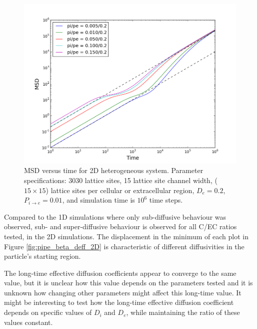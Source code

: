 	\begin{figure}[h]
		\centering
		\includegraphics[width=1.0\linewidth]{../images/2D/pipe_msd_2D}
		\caption{MSD versus time for 2D heterogeneous system. Parameter specifications: 3030 lattice sites, 15 lattice site channel width, ($ 15 \times 15 $) lattice sites per cellular or extracellular region, $ D_e = 0.2 $, $ P_{i \rightarrow e} = 0.01 $, and simulation time is $ 10^6 $ time steps.}
		\label{fig:pipe_msd_2D}
	\end{figure}
	
	Compared to the 1D simulations where only sub-diffusive behaviour was observed, sub- and super-diffusive behaviour is observed for all C/EC ratios tested, in the 2D simulations. The displacement in the minimum of each plot in Figure \ref{fig:pipe_beta_deff_2D} is characteristic of different diffusivities in the particle's starting region.
	
	The long-time effective diffusion coefficients appear to converge to the same value, but it is unclear how this value depends on the parameters tested and it is unknown how changing other parameters might affect this long-time value. It might be interesting to test how the long-time effective diffusion coefficient depends on specific values of $ D_i $ and $ D_e $, while maintaining the ratio of these values constant.
	
